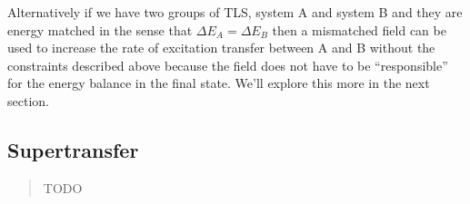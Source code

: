 \documentclass[
]{article}
\renewcommand{\[}{\begin{equation}}
\renewcommand{\]}{\end{equation}}
\begin{document}
Alternatively if we have two groups of TLS, system A and system B and
they are energy matched in the sense that \(\Delta E_A = \Delta E_B\)
then a mismatched field can be used to increase the rate of excitation
transfer between A and B without the constraints described above because
the field does not have to be ``responsible'' for the energy balance in
the final state. We'll explore this more in the next section.

\subsection{Supertransfer}\label{supertransfer}

\begin{quote}
TODO
\end{quote}

\printbibliography
\end{document}
